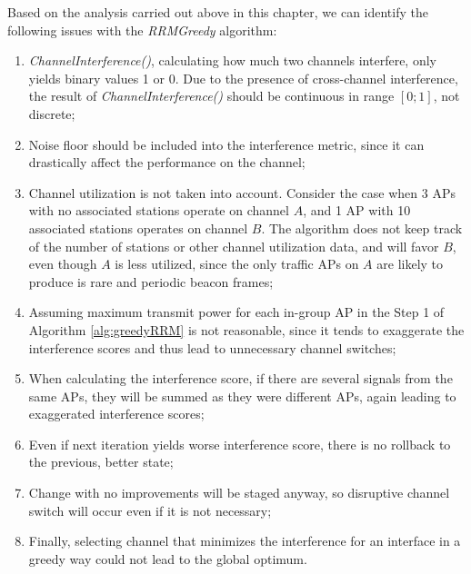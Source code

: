 Based on the analysis carried out above in this chapter, we can identify the following issues with the \textit{RRMGreedy} algorithm:
\begin{enumerate}
    \item \textit{ChannelInterference()}, calculating how much two channels interfere, only yields binary values 1 or 0. Due to the presence of cross-channel interference, the result of \textit{ChannelInterference()} should be continuous in range $[0; 1]$, not discrete;
    \item Noise floor should be included into the interference metric, since it can drastically affect the performance on the channel;
    \item Channel utilization is not taken into account. Consider the case when 3 APs with no associated stations operate on channel $A$, and 1 AP with 10 associated stations operates on channel $B$. The algorithm does not keep track of the number of stations or other channel utilization data, and will favor $B$, even though $A$ is less utilized, since the only traffic APs on $A$ are likely to produce is rare and periodic beacon frames;
    \item Assuming maximum transmit power for each in-group AP in the Step 1 of Algorithm \ref{alg:greedyRRM} is not reasonable, since it tends to exaggerate the interference scores and thus lead to unnecessary channel switches;
    \item When calculating the interference score, if there are several signals from the same APs, they will be summed as they were different APs, again leading to exaggerated interference scores;
    \item Even if next iteration yields worse interference score, there is no rollback to the previous, better state;
    \item Change with no improvements will be staged anyway, so disruptive channel switch will occur even if it is not necessary;
    \item Finally, selecting channel that minimizes the interference for an interface in a greedy way could not lead to the global optimum.
\end{enumerate}

